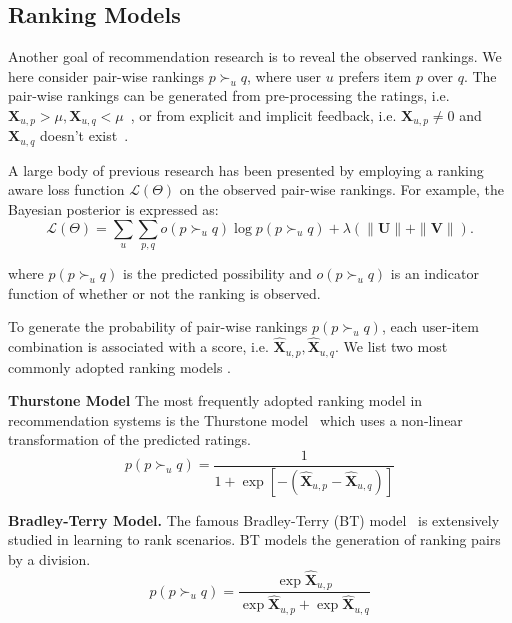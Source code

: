 \documentclass[letterpaper]{article} %
\newcommand{\Rating}{\mathbf{X}}
\newcommand{\Loss}{\mathcal{L}}
\begin{document}
\subsection{Ranking Models}
Another goal of recommendation research is to reveal the observed rankings. We here consider pair-wise rankings $p\succ_u q$, where user $u$ prefers item $p$ over $q$. The pair-wise rankings can be generated from pre-processing  the ratings, i.e. $\Rating_{u,p}> \mu, \Rating_{u,q}<\mu$~\cite{Hu2017Decoupled}, or from explicit and implicit feedback, i.e. $\Rating_{u,p}\neq 0$ and $ \Rating_{u,q}$ doesn't exist~\cite{Rendle2009BPR}. 

A large body of previous research has been presented by employing a ranking aware loss function  $\Loss(\Theta)$ on the observed pair-wise rankings. For example, the Bayesian posterior is expressed as:
\begin{equation}
\Loss(\Theta) = \sum_{u}\sum_{p,q} o(p\succ_u q) \log p(p\succ_u q) + \lambda(\|\mathbf{U}\| + \|\mathbf{V}\|).
\end{equation}

where $p(p\succ_u q)$ is the predicted possibility and $o(p\succ_u q)$ is an indicator function of whether or not the ranking is observed. 

To generate the probability of pair-wise rankings $p(p\succ_u q)$,  each user-item combination is associated with a score, i.e. $\hat{\Rating}_{u,p},\hat{\Rating}_{u,q}$.  We list two most commonly adopted ranking models . 


\textbf{Thurstone Model} The most frequently adopted ranking model in recommendation systems is the Thurstone model~\cite{Thurstone1927law} which uses a non-linear transformation of the predicted ratings. 
\begin{equation}
p(p\succ_u q) = \frac{1} {1+\exp[-(\hat{\Rating}_{u,p}-\hat{\Rating}_{u,q})]}
\end{equation}

\textbf{Bradley-Terry Model.} The famous Bradley-Terry (BT) model~\cite{Hunter2004MM} is extensively studied in learning to rank scenarios. BT models the generation of ranking pairs by a division.
\begin{equation}\label{equ:BT}
p(p\succ_u q) = \frac{\exp{\hat{\Rating}_{u,p}}}{\exp{\hat{\Rating}_{u,p}}+ \exp{\hat{\Rating}_{u,q}}} 
\end{equation}
\end{document}
